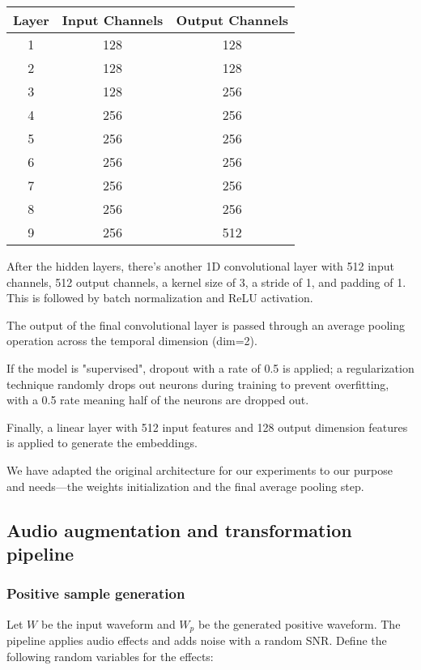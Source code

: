 \begin{tabular}{|c|c|c|}
\hline
\textbf{Layer} & \textbf{Input Channels} & \textbf{Output Channels} \\
\hline
1 & 128 & 128 \\
\hline
2 & 128 & 128 \\
\hline
3 & 128 & 256 \\
\hline
4 & 256 & 256 \\
\hline
5 & 256 & 256 \\
\hline
6 & 256 & 256 \\
\hline
7 & 256 & 256 \\
\hline
8 & 256 & 256 \\
\hline
9 & 256 & 512 \\
\hline
\end{tabular}

After the hidden layers, there's another 1D convolutional layer with 512 input channels, 512 output channels, a kernel size of 3, a stride of 1, and padding of 1. This is followed by batch normalization and ReLU activation.

The output of the final convolutional layer is passed through an average pooling operation across the temporal dimension (dim=2).

If the model is "supervised", dropout with a rate of 0.5 is applied; a regularization technique randomly drops out neurons during training to prevent overfitting, with a 0.5 rate meaning half of the neurons are dropped out.



Finally, a linear layer with 512 input features and 128 output dimension features is applied to generate the embeddings.



We have adapted the original architecture for our experiments to our purpose and needs—the weights initialization and the final average pooling step.

\subsection{Audio augmentation and transformation pipeline}
\subsubsection{Positive sample generation}
Let $W$ be the input waveform and $W_p$ be the generated positive waveform. The pipeline applies audio effects and adds noise with a random SNR. Define the following random variables for the effects:

